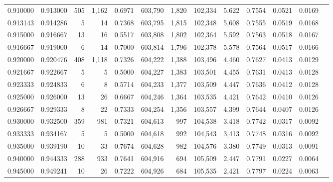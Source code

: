 \begin{tabular}{rrrrrrrrrrrrr}
0.910000 & 0.913000 &    505 & 1,162 &                                     0.6971 & 603,790 &   1,820 & 102,334 &   5,622 & 0.7554 & 0.0521 & 0.0169 \\
0.913143 & 0.914286 &      5 &    14 &                                     0.7368 & 603,795 &   1,815 & 102,348 &   5,608 & 0.7555 & 0.0519 & 0.0168 \\
0.915000 & 0.916667 &     13 &    16 &                                     0.5517 & 603,808 &   1,802 & 102,364 &   5,592 & 0.7563 & 0.0518 & 0.0167 \\
0.916667 & 0.919000 &      6 &    14 &                                     0.7000 & 603,814 &   1,796 & 102,378 &   5,578 & 0.7564 & 0.0517 & 0.0166 \\
0.920000 & 0.920476 &    408 & 1,118 &                                     0.7326 & 604,222 &   1,388 & 103,496 &   4,460 & 0.7627 & 0.0413 & 0.0129 \\
0.921667 & 0.922667 &      5 &     5 &                                     0.5000 & 604,227 &   1,383 & 103,501 &   4,455 & 0.7631 & 0.0413 & 0.0128 \\
0.923333 & 0.924833 &      6 &     8 &                                     0.5714 & 604,233 &   1,377 & 103,509 &   4,447 & 0.7636 & 0.0412 & 0.0128 \\
0.925000 & 0.926000 &     13 &    26 &                                     0.6667 & 604,246 &   1,364 & 103,535 &   4,421 & 0.7642 & 0.0410 & 0.0126 \\
0.926667 & 0.929333 &      8 &    22 &                                     0.7333 & 604,254 &   1,356 & 103,557 &   4,399 & 0.7644 & 0.0407 & 0.0126 \\
0.930000 & 0.932500 &    359 &   981 &                                     0.7321 & 604,613 &     997 & 104,538 &   3,418 & 0.7742 & 0.0317 & 0.0092 \\
0.933333 & 0.934167 &      5 &     5 &                                     0.5000 & 604,618 &     992 & 104,543 &   3,413 & 0.7748 & 0.0316 & 0.0092 \\
0.935000 & 0.939190 &     10 &    33 &                                     0.7674 & 604,628 &     982 & 104,576 &   3,380 & 0.7749 & 0.0313 & 0.0091 \\
0.940000 & 0.944333 &    288 &   933 &                                     0.7641 & 604,916 &     694 & 105,509 &   2,447 & 0.7791 & 0.0227 & 0.0064 \\
0.945000 & 0.949241 &     10 &    26 &                                     0.7222 & 604,926 &     684 & 105,535 &   2,421 & 0.7797 & 0.0224 & 0.0063 \\

\end{tabular}
